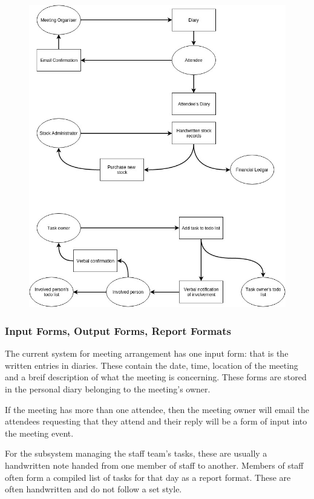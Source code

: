 \begin{figure}[H]
	\includegraphics[width=\textwidth]{./Analysis/diagrams/dfc.jpg}
\end{figure}

\subsubsection{Input Forms, Output Forms, Report Formats}

The current system for meeting arrangement has one input form: that is the written entries in diaries. These contain the date,
 time, location of the meeting and a breif description of what the meeting is concerning. These forms are stored in the personal
 diary belonging to the meeting's owner.

If the meeting has more than one attendee, then the meeting owner will email the attendees requesting that they attend and their
 reply will be a form of input into the meeting event.

For the subsystem managing the staff team's tasks, these are usually a handwritten note handed from one member of staff to another.
 Members of staff often form a compiled list of tasks for that day as a report format. These are often handwritten and do not follow a set style.

